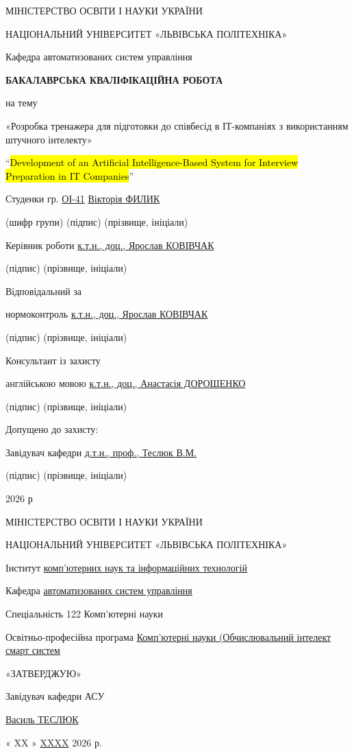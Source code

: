\usepackage{textcomp}
\usepackage{hyperref}
\usepackage{graphicx}МІНІСТЕРСТВО ОСВІТИ І НАУКИ УКРАЇНИ

НАЦІОНАЛЬНИЙ УНІВЕРСИТЕТ «ЛЬВІВСЬКА ПОЛІТЕХНІКА»

Кафедра автоматизованих систем управління

\textbf{БАКАЛАВРСЬКА КВАЛІФІКАЦІЙНА РОБОТА}

на тему

«Розробка тренажера для підготовки до співбесід в ІТ-компаніях з
використанням штучного інтелекту»

``\hl{Development of an Artificial Intelligence-Based System for
Interview Preparation in IT Companies}''

Студенки гр. \ul{ОІ-41} \ul{Вікторія ФИЛИК}

(шифр групи) (підпис) (прізвище, ініціали)

Керівник роботи \ul{к.т.н., доц., Ярослав КОВІВЧАК}

(підпис) (прізвище, ініціали)

Відповідальний за

нормоконтроль \ul{к.т.н., доц., Ярослав КОВІВЧАК}

(підпис) (прізвище, ініціали)

Консультант із захисту

англійською мовою \ul{к.т.н., доц., Анастасія ДОРОШЕНКО}

(підпис) (прізвище, ініціали)

Допущено до захисту:

Завідувач кафедри \ul{д.т.н., проф., Теслюк В.М.}

(підпис) (прізвище, ініціали)

2026 р

МІНІСТЕРСТВО ОСВІТИ І НАУКИ УКРАЇНИ

НАЦІОНАЛЬНИЙ УНІВЕРСИТЕТ «ЛЬВІВСЬКА ПОЛІТЕХНІКА»

Інститут \ul{комп'ютерних наук та інформаційних технологій}

Кафедра \ul{автоматизованих систем управління}

Спеціальність 122 Комп'ютерні науки

Освітньо-професійна програма \ul{Комп'ютерні науки (Обчислювальний
інтелект смарт систем}

«ЗАТВЕРДЖУЮ»

Завідувач кафедри АСУ

\ul{Василь ТЕСЛЮК}

« XX » \ul{XXXX} 2026 р.

